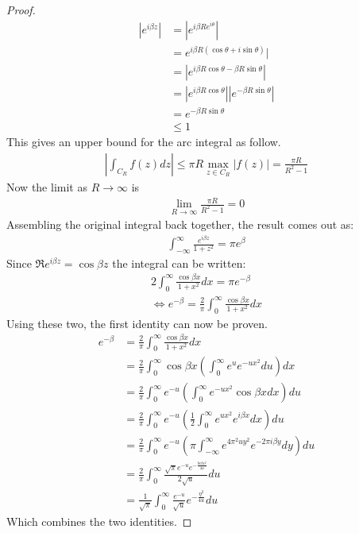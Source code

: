 \begin{proof}
    \begin{align*}
        |e^{i\beta z}|&=|e^{i\beta Re^{i\theta}}|\\
        &=e^{i\beta R(\cos{\theta}+i\sin{\theta})}|\\
        &=|e^{i\beta R\cos{\theta}-\beta R\sin{\theta}}| \\
        &=|e^{i\beta R\cos{\theta}}||e^{-\beta R\sin{\theta}}|\\
        &=e^{-\beta R\sin{\theta}} \\
        &\leq 1
    \end{align*}
    This gives an upper bound for the arc integral as follow.
    \begin{gather*}
        |\int_{C_R}f(z)dz|\leq\pi R\max_{z\in C_R}|f(z)|=\frac{\pi R}{R^2-1}
    \end{gather*}
    Now the limit as $R\rightarrow\infty$ is
    \begin{gather*}
        \lim_{R\rightarrow\infty}\frac{\pi R}{R^2-1}=0
    \end{gather*}
    Assembling the original integral back together, the result comes out as:
    \begin{gather*}
        \int_{-\infty}^\infty \frac{e^{i\beta z}}{1+z^2}=\pi e^{\beta}
    \end{gather*}
    Since $\Re{e^{i\beta z}}=\cos{\beta z}$ the integral can be written:
    \begin{gather*}
        2\int_0^\infty\frac{\cos{\beta x}}{1+x^2}dx=\pi e^{-\beta} \\
        \Leftrightarrow e^{-\beta} = \frac{2}{\pi}\int_0^\infty\frac{\cos{\beta x}}{1+x^2}dx
    \end{gather*}
    Using these two, the first identity can now be proven.
    \begin{align*}
        e^{-\beta}&=\frac{2}{\pi}\int_0^\infty\frac{\cos{\beta x}}{1+x^2}dx \\
        &=\frac{2}{\pi}\int_0^\infty \cos{\beta x}\left(\int_0^\infty e^{u}e^{-ux^2}du\right) dx \\
        &=\frac{2}{\pi}\int_0^\infty e^{-u}\left(\int_0^\infty e^{-ux^2}\cos{\beta x}dx \right)du \\
        &=\frac{2}{\pi}\int_0^\infty e^{-u}\left(\frac{1}{2}\int_0^\infty e^{ux^2}e^{i\beta x}dx \right)du \\
        &=\frac{2}{\pi}\int_0^\infty e^{-u}\left(\pi\int_{-\infty}^\infty e^{4\pi^2uy^2}e^{-2\pi i\beta y}dy\right)du \\
        &=\frac{2}{\pi}\int_0^\infty \frac{\sqrt{\pi}e^{-u}e^{-\frac{beta^2}{4u}}}{2\sqrt{u}}du \\
        &=\frac{1}{\sqrt{\pi}}\int_0^\infty \frac{e^{-u}}{\sqrt{u}}e^{-\frac{\eta^2}{4u}}du
    \end{align*}
    Which combines the two identities.
    

\end{proof}
